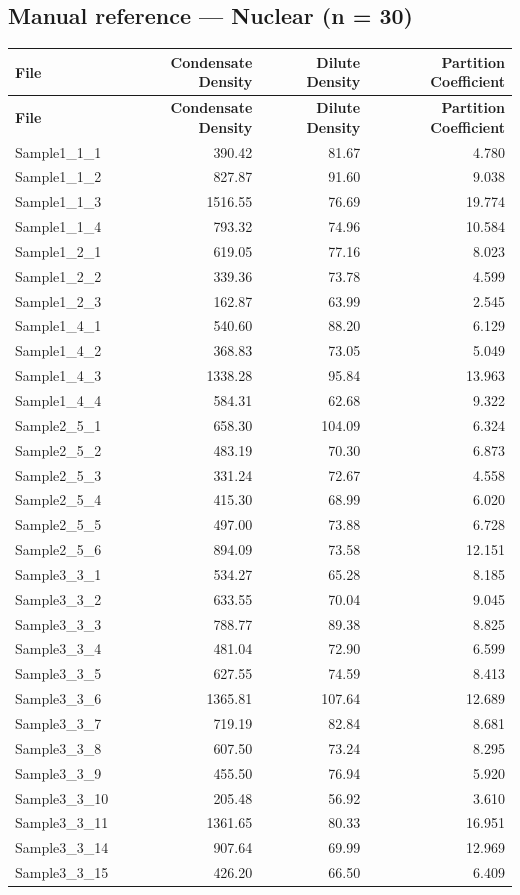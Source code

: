 \documentclass[11pt]{article}
\begin{document}
\subsection{Manual reference --- Nuclear (n = 30)}
\begin{center}
\begin{longtable}{l r r r}
\toprule
\textbf{File} & \textbf{Condensate Density} & \textbf{Dilute Density} & \textbf{Partition Coefficient} \\
\midrule
\endfirsthead
\toprule
\textbf{File} & \textbf{Condensate Density} & \textbf{Dilute Density} & \textbf{Partition Coefficient} \\
\midrule
\endhead
\bottomrule
\endlastfoot
Sample1\_1\_1 & 390.42 & 81.67 & 4.780 \\
Sample1\_1\_2 & 827.87 & 91.60 & 9.038 \\
Sample1\_1\_3 & 1516.55 & 76.69 & 19.774 \\
Sample1\_1\_4 & 793.32 & 74.96 & 10.584 \\
Sample1\_2\_1 & 619.05 & 77.16 & 8.023 \\
Sample1\_2\_2 & 339.36 & 73.78 & 4.599 \\
Sample1\_2\_3 & 162.87 & 63.99 & 2.545 \\
Sample1\_4\_1 & 540.60 & 88.20 & 6.129 \\
Sample1\_4\_2 & 368.83 & 73.05 & 5.049 \\
Sample1\_4\_3 & 1338.28 & 95.84 & 13.963 \\
Sample1\_4\_4 & 584.31 & 62.68 & 9.322 \\
Sample2\_5\_1 & 658.30 & 104.09 & 6.324 \\
Sample2\_5\_2 & 483.19 & 70.30 & 6.873 \\
Sample2\_5\_3 & 331.24 & 72.67 & 4.558 \\
Sample2\_5\_4 & 415.30 & 68.99 & 6.020 \\
Sample2\_5\_5 & 497.00 & 73.88 & 6.728 \\
Sample2\_5\_6 & 894.09 & 73.58 & 12.151 \\
Sample3\_3\_1 & 534.27 & 65.28 & 8.185 \\
Sample3\_3\_2 & 633.55 & 70.04 & 9.045 \\
Sample3\_3\_3 & 788.77 & 89.38 & 8.825 \\
Sample3\_3\_4 & 481.04 & 72.90 & 6.599 \\
Sample3\_3\_5 & 627.55 & 74.59 & 8.413 \\
Sample3\_3\_6 & 1365.81 & 107.64 & 12.689 \\
Sample3\_3\_7 & 719.19 & 82.84 & 8.681 \\
Sample3\_3\_8 & 607.50 & 73.24 & 8.295 \\
Sample3\_3\_9 & 455.50 & 76.94 & 5.920 \\
Sample3\_3\_10 & 205.48 & 56.92 & 3.610 \\
Sample3\_3\_11 & 1361.65 & 80.33 & 16.951 \\
Sample3\_3\_14 & 907.64 & 69.99 & 12.969 \\
Sample3\_3\_15 & 426.20 & 66.50 & 6.409 \\
\end{longtable}
\end{center}
\end{document}
